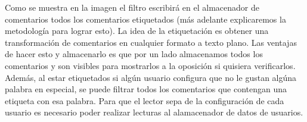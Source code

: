 \begin{spacing}{1.5}
Como se muestra en la imagen el filtro escribirá en el almacenador de comentarios todos los comentarios etiquetados (más adelante explicaremos la metodología para lograr esto). La idea de la etiquetación es obtener una transformación de comentarios en cualquier formato a texto plano. Las ventajas de hacer esto y almacenarlo es que por un lado almacenamos todos los comentarios y son visibles para mostrarlos a la oposición si quisiera verificarlos. 
Además, al estar etiquetados si algún usuario configura que no le gustan algúna palabra en especial, se puede filtrar todos los comentarios que contengan una etiqueta con esa palabra. Para que el lector sepa de la configuración de cada usuario es necesario poder realizar lecturas al alamacenador de datos de usuarios.
\end{spacing}

